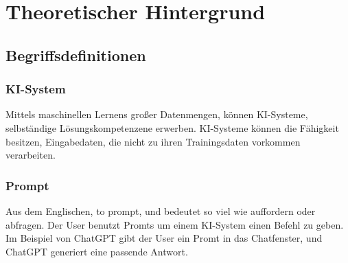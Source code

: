 \documentclass[12pt,a4paper,bibliography=totocnumbered,listof=totocnumbered]{scrartcl}
\begin{document}
\section{Theoretischer Hintergrund}

\subsection{Begriffsdefinitionen}%

\subsubsection{KI-System} %
Mittels maschinellen Lernens großer Datenmengen, können KI-Systeme, selbständige Lösungskompetenzene  erwerben. KI-Systeme können die Fähigkeit besitzen, Eingabedaten, die nicht zu ihren Trainingsdaten vorkommen verarbeiten.
\subsubsection{Prompt} %
 Aus dem Englischen, to prompt, und bedeutet so viel wie auffordern oder abfragen. Der User benutzt Promts um einem KI-System einen Befehl zu geben. Im Beispiel von ChatGPT gibt der User ein Promt in das Chatfenster, und ChatGPT generiert eine passende Antwort.
\end{document}
